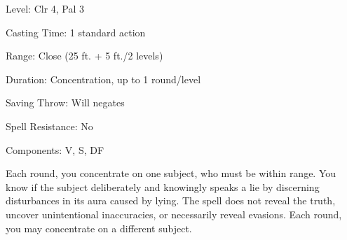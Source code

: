 
\begin{description*}
\item[Level:] Clr 4, Pal 3
\item[Casting Time:] 1 standard action
\item[Range:] Close (25 ft. + 5 ft./2 levels)
\item[Duration:] Concentration, up to 1 round/level
\item[Saving Throw:] Will negates
\item[Spell Resistance:] No
\item[Components:] V, S, DF
\end{description*}

Each round, you concentrate on one subject, who must be within range. You know
if the subject deliberately and knowingly speaks a lie by discerning disturbances
in its aura caused by lying. The spell does not reveal the truth, uncover unintentional
inaccuracies, or necessarily reveal evasions.
Each round, you may concentrate on a different subject.